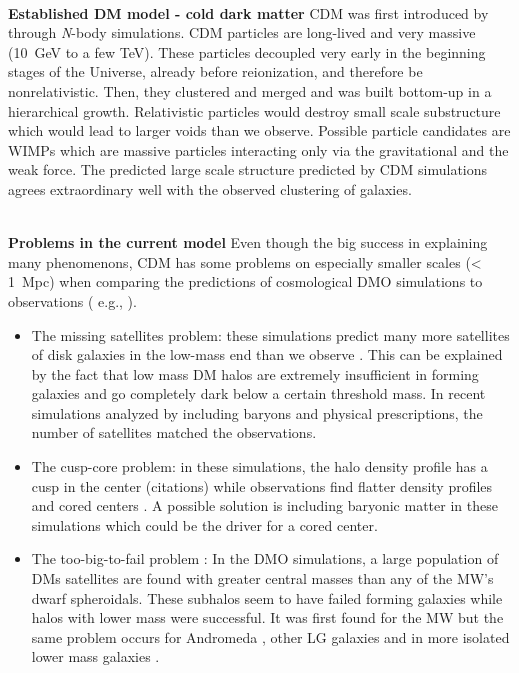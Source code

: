 \\\textbf{Established \ac{DM} model - cold dark matter}
\ac{CDM} was first introduced by \cite{Davis....CDM...1985} through \textit{N}-body simulations. \ac{CDM} particles are long-lived and very massive (\SI{10}{GeV} to a few TeV). These particles decoupled very early in the beginning stages of the Universe, already before reionization, and therefore be nonrelativistic. Then, they clustered and merged and was built bottom-up in a hierarchical growth.  Relativistic particles would destroy small scale substructure which would lead to larger voids than we observe. Possible particle candidates are \ac{WIMPs} which are massive particles interacting only via the gravitational and the weak force. The predicted large scale structure predicted by \ac{CDM} simulations agrees extraordinary well with the observed clustering of galaxies. 

\\\textbf{Problems in the current model}
Even though the big success in explaining many phenomenons, \ac{CDM} has some problems on especially smaller scales (< \SI{1}{Mpc}) when comparing the predictions of cosmological \ac{DMO} simulations to observations ( e.g., \cite{Bullock...LCDMprobs...2017}). 
\begin{itemize}
    \item The missing satellites problem: these simulations predict many more satellites of disk galaxies in the low-mass end than we observe \citep{Klypin...missingsatellites...1999, Moore...missingsatellites..1999}. This can be explained by the fact that low mass \ac{DM} halos are extremely insufficient in forming galaxies and go completely dark below a certain threshold mass. In recent simulations analyzed by \citet{Sawala...noCDMproblems...2016} including baryons and physical prescriptions, the number of satellites matched the observations.
    \item The cusp-core problem: in these simulations, the halo density profile has a cusp in the center (citations) while observations find flatter density profiles and cored centers \citep{Flores...cuspcoreprob...1994, Moore...cuspcoreprob...1994}. A possible solution is including baryonic matter in these simulations which could be the driver for a cored center. 
    \item The too-big-to-fail problem \citep{Boylan...toobigtoofail...2011}: In the \ac{DMO} simulations, a large population of \acp{DM} satellites are found with greater central masses than any of the \ac{MW}'s dwarf spheroidals. These subhalos seem to have failed forming galaxies while halos with lower mass were successful. It was first found for the \ac{MW} but the same problem occurs for Andromeda \citep{Tollerud...M31tbtf...2014}, other \ac{LG} galaxies \citep{Kirby...LGtbtf...2014} and in more isolated lower mass galaxies \citep{Ferrero...DGtbtf...2012, Papastergis...DGtbtf...2015, Papastergis...DGtbtf...2016}.
    \iffalse\item The planes of satellites problem: \fi
\end{itemize}

